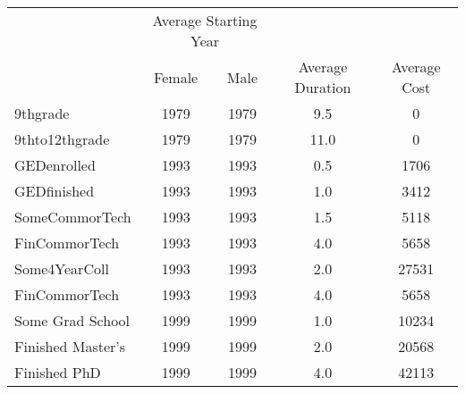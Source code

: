 \begin{tabular}{lcccc} \hline \hline
 & \multicolumn{2}{c}{Average Starting Year} & & \\
 & Female  & Male  & Average Duration  & Average Cost  \\  \hline 
 9thgrade &      1979 &      1979 &       9.5 &         0 \\  
 9thto12thgrade &      1979 &      1979 &      11.0 &         0 \\  
 GEDenrolled &      1993 &      1993 &       0.5 &      1706 \\  
 GEDfinished &      1993 &      1993 &       1.0 &      3412 \\  
 SomeCommorTech &      1993 &      1993 &       1.5 &      5118 \\  
 FinCommorTech &      1993 &      1993 &       4.0 &      5658 \\  
 Some4YearColl &      1993 &      1993 &       2.0 &     27531 \\  
 FinCommorTech &      1993 &      1993 &       4.0 &      5658 \\  
 Some Grad School &      1999 &      1999 &       1.0 &     10234 \\  
 Finished Master's &      1999 &      1999 &       2.0 &     20568 \\  
 Finished PhD &      1999 &      1999 &       4.0 &     42113 \\  
\hline \hline \end{tabular}
